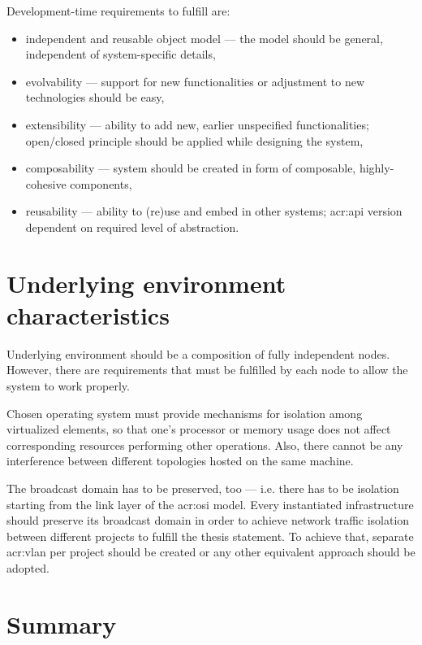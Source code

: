 \documentclass[11pt,openany]{book}
\begin{document}
      Development-time requirements to fulfill are:

      \begin{itemize}
        \item independent and reusable object model --- the model should be general, independent of system-specific
                                                        details,
        \item evolvability --- support for new functionalities or adjustment to new technologies should be easy,
        \item extensibility --- ability to add new, earlier unspecified functionalities; open/closed principle should be
                                applied while designing the system,
        \item composability --- system should be created in form of composable, highly-cohesive components,
        \item reusability --- ability to (re)use and embed in other systems; \gls{acr:api} version dependent on required
                              level of abstraction.
      \end{itemize}


    \section{Underlying environment characteristics}
    \label{sec:req:env}

      Underlying environment should be a composition of fully independent nodes. However, there are requirements that
      must be fulfilled by each node to allow the system to work properly.

      Chosen operating system must provide mechanisms for isolation among virtualized elements, so that one's processor
      or memory usage does not affect corresponding resources performing other operations. Also, there cannot be any
      interference between different topologies hosted on the same machine.

      The broadcast domain has to be preserved, too --- i.e. there has to be isolation starting from the link layer of
      the \gls{acr:osi} model. Every instantiated infrastructure should preserve its broadcast domain in order to
      achieve network traffic isolation between different projects to fulfill the thesis statement. To achieve that,
      separate \gls{acr:vlan} per project should be created or any other equivalent approach should be adopted.


    \section*{Summary}
\end{document}
